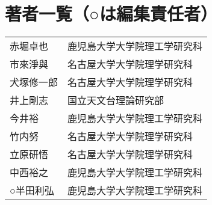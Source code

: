 \newpage
\section*{著者一覧（○は編集責任者）}

\begin{tabular}{ll}
赤堀卓也 & 鹿児島大学大学院理工学研究科 \\
市來淨與 & 名古屋大学大学院理学研究科 \\
犬塚修一郎 & 名古屋大学大学院理学研究科 \\
井上剛志 & 国立天文台理論研究部 \\
今井裕 & 鹿児島大学大学院理工学研究科 \\
竹内努 & 名古屋大学大学院理学研究科 \\
立原研悟 & 名古屋大学大学院理学研究科 \\
中西裕之 & 鹿児島大学大学院理工学研究科 \\
○半田利弘 & 鹿児島大学大学院理工学研究科 \\
\end{tabular}

